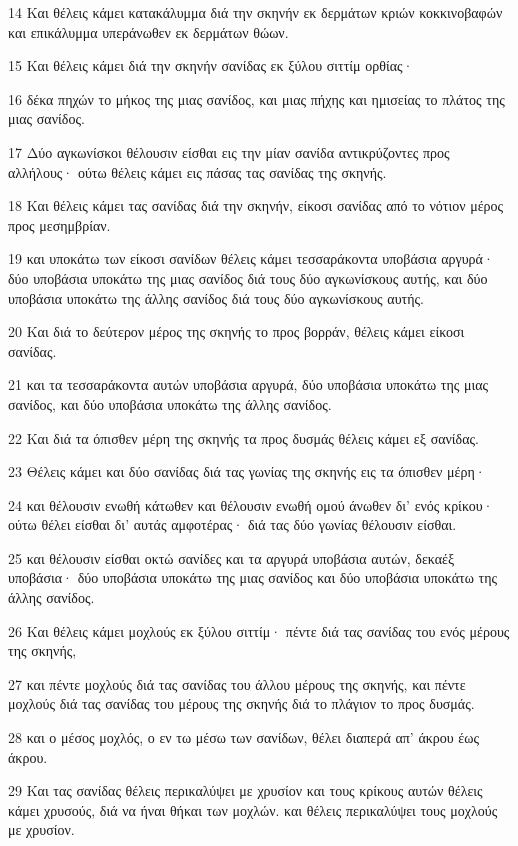 \par 14 Και θέλεις κάμει κατακάλυμμα διά την σκηνήν εκ δερμάτων κριών κοκκινοβαφών και επικάλυμμα υπεράνωθεν εκ δερμάτων θώων.
\par 15 Και θέλεις κάμει διά την σκηνήν σανίδας εκ ξύλου σιττίμ ορθίας·
\par 16 δέκα πηχών το μήκος της μιας σανίδος, και μιας πήχης και ημισείας το πλάτος της μιας σανίδος.
\par 17 Δύο αγκωνίσκοι θέλουσιν είσθαι εις την μίαν σανίδα αντικρύζοντες προς αλλήλους· ούτω θέλεις κάμει εις πάσας τας σανίδας της σκηνής.
\par 18 Και θέλεις κάμει τας σανίδας διά την σκηνήν, είκοσι σανίδας από το νότιον μέρος προς μεσημβρίαν.
\par 19 και υποκάτω των είκοσι σανίδων θέλεις κάμει τεσσαράκοντα υποβάσια αργυρά· δύο υποβάσια υποκάτω της μιας σανίδος διά τους δύο αγκωνίσκους αυτής, και δύο υποβάσια υποκάτω της άλλης σανίδος διά τους δύο αγκωνίσκους αυτής.
\par 20 Και διά το δεύτερον μέρος της σκηνής το προς βορράν, θέλεις κάμει είκοσι σανίδας.
\par 21 και τα τεσσαράκοντα αυτών υποβάσια αργυρά, δύο υποβάσια υποκάτω της μιας σανίδος, και δύο υποβάσια υποκάτω της άλλης σανίδος.
\par 22 Και διά τα όπισθεν μέρη της σκηνής τα προς δυσμάς θέλεις κάμει εξ σανίδας.
\par 23 Θέλεις κάμει και δύο σανίδας διά τας γωνίας της σκηνής εις τα όπισθεν μέρη·
\par 24 και θέλουσιν ενωθή κάτωθεν και θέλουσιν ενωθή ομού άνωθεν δι' ενός κρίκου· ούτω θέλει είσθαι δι' αυτάς αμφοτέρας· διά τας δύο γωνίας θέλουσιν είσθαι.
\par 25 και θέλουσιν είσθαι οκτώ σανίδες και τα αργυρά υποβάσια αυτών, δεκαέξ υποβάσια· δύο υποβάσια υποκάτω της μιας σανίδος και δύο υποβάσια υποκάτω της άλλης σανίδος.
\par 26 Και θέλεις κάμει μοχλούς εκ ξύλου σιττίμ· πέντε διά τας σανίδας του ενός μέρους της σκηνής,
\par 27 και πέντε μοχλούς διά τας σανίδας του άλλου μέρους της σκηνής, και πέντε μοχλούς διά τας σανίδας του μέρους της σκηνής διά το πλάγιον το προς δυσμάς.
\par 28 και ο μέσος μοχλός, ο εν τω μέσω των σανίδων, θέλει διαπερά απ' άκρου έως άκρου.
\par 29 Και τας σανίδας θέλεις περικαλύψει με χρυσίον και τους κρίκους αυτών θέλεις κάμει χρυσούς, διά να ήναι θήκαι των μοχλών. και θέλεις περικαλύψει τους μοχλούς με χρυσίον.
